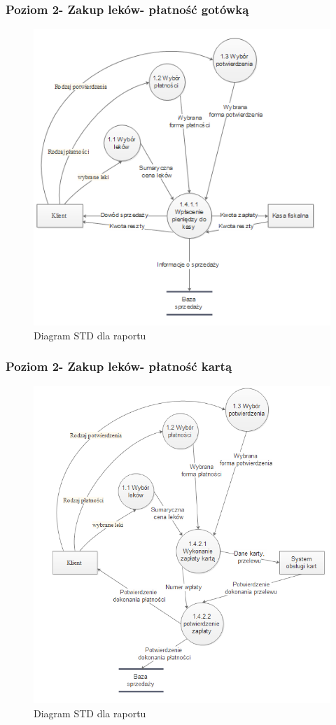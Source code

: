 \documentclass[a4paper, 11pt]{article}
\begin{document}
		\subsubsection{Poziom 2- Zakup leków- płatność gotówką}
			\begin{figure}[H]
			\centerline{\includegraphics[scale=1]{dfdp21.png}}
			\caption{Diagram STD dla raportu}
			\end{figure}
		\subsubsection{Poziom 2- Zakup leków- płatność kartą}
			\begin{figure}[H]
			\centerline{\includegraphics[scale=1]{dfdp22.png}}
			\caption{Diagram STD dla raportu}
			\end{figure}
			
\end{document}
